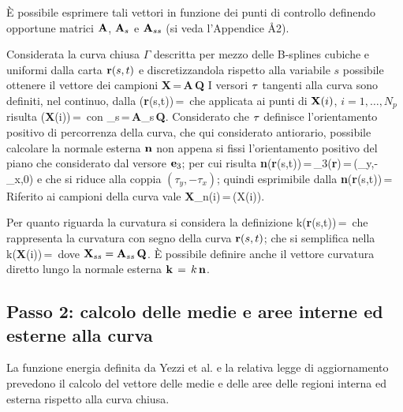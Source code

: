 \`E possibile esprimere tali vettori in funzione dei punti di controllo definendo opportune
matrici ${\bf A}$, ${\bf A}_s$ e ${\bf A}_{ss}$ (si veda l'Appendice \r{A2}).\par
Considerata la curva chiusa $\Gamma$ descritta per mezzo delle B-splines cubiche e 
uniformi dalla carta ${\bf r}(s,t)$ e discretizzandola rispetto alla variabile $s$ \e possibile
ottenere il vettore dei campioni
\be
{\bf X}\,=\,{\bf A}\,{\bf Q}
\ee
I versori ${\bf \tau}$ tangenti alla curva sono definiti, nel continuo, dalla
\be
{\bf \tau}({\bf r}(s,t))\,=\,
\ee
che applicata ai punti di ${\bf X}(i)$, $i=1,\dots,N_p$ risulta
\be
{\bf \tau}({\bf X}(i))\,=\, \quad con _s\,=\,{\bf A}_s\,{\bf Q}.
\ee
Considerato che ${\bf \tau}$ definisce l'orientamento positivo di percorrenza della curva,
che qui \e considerato antiorario, \e possibile calcolare la normale esterna ${\bf n}$ non
appena si fissi l'orientamento positivo del piano che \e considerato dal versore ${\bf e}_3$;
per cui risulta
\be
{\bf n}({\bf r}(s,t))\,=\,{\bf \tau}_3({\bf r})\,=\,(\tau_y,-\tau_x,0)
\ee
e che si riduce alla coppia $(\tau_y,-\tau_x)$; quindi esprimibile dalla 
\be
{\bf n}({\bf r}(s,t))\,=\,
\ee
Riferito ai campioni della curva vale
\be
{\bf X}_n(i)\,=\,(X(i)).
\ee

Per quanto riguarda la curvatura si considera la definizione
\be
k({\bf r}(s,t))\,=\,
\ee
che rappresenta la curvatura con segno della curva ${\bf r}(s,t)$; che si semplifica nella
\be
k({\bf X}(i))\,=\,
\ee
dove ${\bf X}_{ss}={\bf A}_{ss}\,{\bf Q}$.
\`E possibile definire anche il vettore curvatura diretto lungo la normale esterna
${\bf k}\,=\,k\,{\bf n}$.

\subsection{Passo 2: calcolo delle medie e aree interne ed esterne alla curva}

La funzione energia definita da Yezzi et al. \cite{Yezzi} e la relativa legge di aggiornamento
prevedono il calcolo del vettore delle medie e delle aree delle regioni interna ed esterna
rispetto alla curva chiusa.

